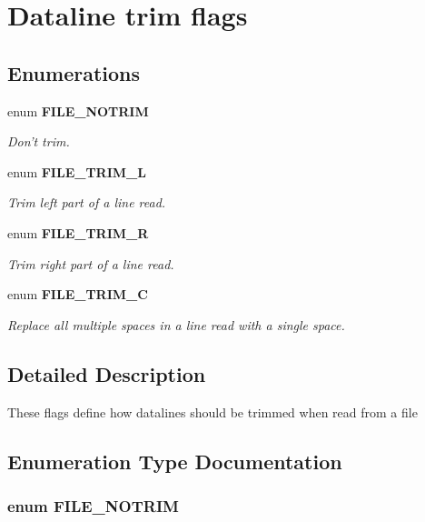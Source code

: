 \section{Dataline trim flags}
\label{group__FILE__TrimFlags}
\subsection*{Enumerations}
\begin{DoxyCompactItemize}
\item 
enum {\bf FILE\_\-NOTRIM} 
\begin{DoxyCompactList}\small\item\em Don't trim. \end{DoxyCompactList}\item 
enum {\bf FILE\_\-TRIM\_\-L} 
\begin{DoxyCompactList}\small\item\em Trim left part of a line read. \end{DoxyCompactList}\item 
enum {\bf FILE\_\-TRIM\_\-R} 
\begin{DoxyCompactList}\small\item\em Trim right part of a line read. \end{DoxyCompactList}\item 
enum {\bf FILE\_\-TRIM\_\-C} 
\begin{DoxyCompactList}\small\item\em Replace all multiple spaces in a line read with a single space. \end{DoxyCompactList}\end{DoxyCompactItemize}


\subsection{Detailed Description}
These flags define how datalines should be trimmed when read from a file 

\subsection{Enumeration Type Documentation}
\subsubsection[{FILE\_\-NOTRIM}]{\setlength{\rightskip}{0pt plus 5cm}enum {\bf FILE\_\-NOTRIM}}\label{group__FILE__TrimFlags_ga3720f2e15eb9e16e29d8ecbb96763662}



